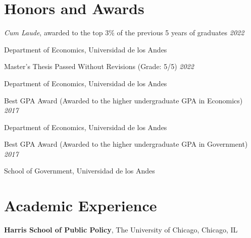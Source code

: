 \documentclass[margin,line]{res}
\newenvironment{list1}{
  \begin{list}{\ding{113}}{%
      \setlength{\itemsep}{0in}
      \setlength{\parsep}{0in} \setlength{\parskip}{0in}
      \setlength{\topsep}{0in} \setlength{\partopsep}{0in} 
      \setlength{\leftmargin}{0.17in}}}{\end{list}}
\begin{document}
\begin{resume}
\vspace{.1cm}

\section{\sc Honors and Awards} 

\textit{Cum Laude}, awarded to the top 3\% of the previous 5 years of graduates \hfill  {\it 2022}
\begin{list1}
\item[]Department of Economics, Universidad de los Andes
\end{list1}

Master's Thesis Passed Without Revisions (Grade: 5/5) \hfill  {\it 2022}
\begin{list1}
\item[]Department of Economics, Universidad de los Andes
\end{list1}

Best GPA Award (Awarded to the higher undergraduate GPA in Economics)  \hfill  {\it 2017}
\begin{list1}
\item[]Department of Economics, Universidad de los Andes
\end{list1}

Best GPA Award (Awarded to the higher undergraduate GPA in Government) \hfill  {\it 2017}
\begin{list1}
\item[]School of Government, Universidad de los Andes
\end{list1}

\vspace{.1cm}

\section{\sc Academic Experience}
{\bf Harris School of Public Policy}, The University of Chicago, Chicago, IL


\end{resume}
\end{document}
